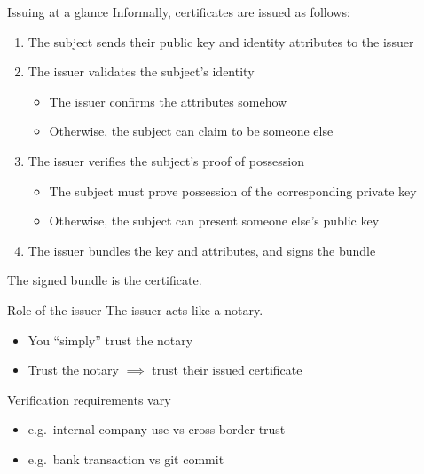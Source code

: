 \begin{frame}{Issuing at a glance}
  Informally, certificates are issued as follows:
  \begin{enumerate}[<+(1)->]
    \item The subject sends their public key and identity attributes to the issuer
    \item The issuer validates the subject's identity
    \par
    \begin{itemize}
      \item The issuer confirms the attributes somehow
      \item Otherwise, the subject can claim to be someone else
    \end{itemize}
    \item The issuer verifies the subject's proof of possession
    \par
    \begin{itemize}
      \item The subject must prove possession of the corresponding private key
      \item Otherwise, the subject can present someone else's public key
    \end{itemize}
    \item The issuer bundles the key and attributes, and signs the bundle
  \end{enumerate}

  \vspace*{0.5em}

  \pause
  The signed bundle is the certificate.
\end{frame}

\begin{frame}{Role of the issuer}
  The issuer acts like a notary.
  \begin{itemize}[<+(1)->]
    \item You \enquote{simply} trust the notary
    \item Trust the notary $\implies$ trust their issued certificate
  \end{itemize}

  \vspace*{1em}

  \pause
  Verification requirements vary
  \begin{itemize}[<+(1)->]
    \item e.g.\ internal company use vs cross-border trust
    \item e.g.\ bank transaction vs git commit
  \end{itemize}
\end{frame}

